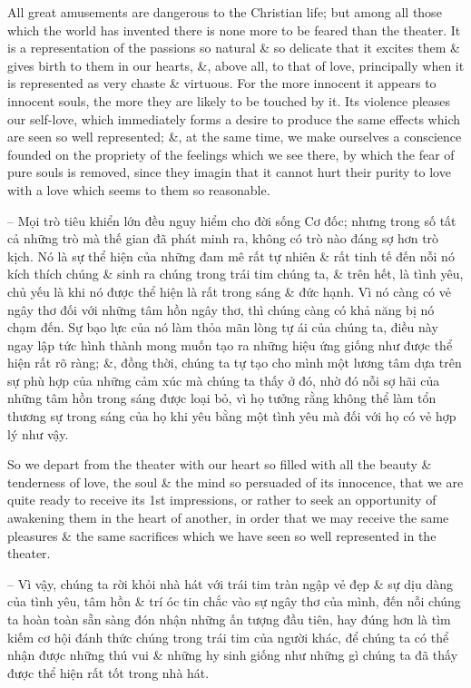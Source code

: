 \documentclass{article}
\begin{document}
\begin{enumerate}
\begin{itemize}
		 All great amusements are dangerous to the Christian life; but among all those which the world has invented there is none more to be feared than the theater. It is a representation of the passions so natural \& so delicate that it excites them \& gives birth to them in our hearts, \&, above all, to that of love, principally when it is represented as very chaste \& virtuous. For the more innocent it appears to innocent souls, the more they are likely to be touched by it. Its violence pleases our self-love, which immediately forms a desire to produce the same effects which are seen so well represented; \&, at the same time, we make ourselves a conscience founded on the propriety of the feelings which we see there, by which the fear of pure souls is removed, since they imagin that it cannot hurt their purity to love with a love which seems to them so reasonable.
		
		-- Mọi trò tiêu khiển lớn đều nguy hiểm cho đời sống Cơ đốc; nhưng trong số tất cả những trò mà thế gian đã phát minh ra, không có trò nào đáng sợ hơn trò kịch. Nó là sự thể hiện của những đam mê rất tự nhiên \& rất tinh tế đến nỗi nó kích thích chúng \& sinh ra chúng trong trái tim chúng ta, \& trên hết, là tình yêu, chủ yếu là khi nó được thể hiện là rất trong sáng \& đức hạnh. Vì nó càng có vẻ ngây thơ đối với những tâm hồn ngây thơ, thì chúng càng có khả năng bị nó chạm đến. Sự bạo lực của nó làm thỏa mãn lòng tự ái của chúng ta, điều này ngay lập tức hình thành mong muốn tạo ra những hiệu ứng giống như được thể hiện rất rõ ràng; \&, đồng thời, chúng ta tự tạo cho mình một lương tâm dựa trên sự phù hợp của những cảm xúc mà chúng ta thấy ở đó, nhờ đó nỗi sợ hãi của những tâm hồn trong sáng được loại bỏ, vì họ tưởng rằng không thể làm tổn thương sự trong sáng của họ khi yêu bằng một tình yêu mà đối với họ có vẻ hợp lý như vậy.
		
		So we depart from the theater with our heart so filled with all the beauty \& tenderness of love, the soul \& the mind so persuaded of its innocence, that we are quite ready to receive its 1st impressions, or rather to seek an opportunity of awakening them in the heart of another, in order that we may receive the same pleasures \& the same sacrifices which we have seen so well represented in the theater.
		
		-- Vì vậy, chúng ta rời khỏi nhà hát với trái tim tràn ngập vẻ đẹp \& sự dịu dàng của tình yêu, tâm hồn \& trí óc tin chắc vào sự ngây thơ của mình, đến nỗi chúng ta hoàn toàn sẵn sàng đón nhận những ấn tượng đầu tiên, hay đúng hơn là tìm kiếm cơ hội đánh thức chúng trong trái tim của người khác, để chúng ta có thể nhận được những thú vui \& những hy sinh giống như những gì chúng ta đã thấy được thể hiện rất tốt trong nhà hát.
		

\end{itemize}
\end{enumerate}
\end{document}
